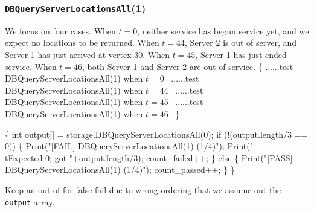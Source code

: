 \documentclass{article}
\def\nwendcode{\endtrivlist \endgroup}
\let\nwdocspar=\par
\theoremstyle{definition}
\begin{document}
\subsubsection{{\tt{}DBQueryServerLocationsAll}(1)}
We focus on four cases. When $t=0$, neither service has begun service yet,
and we expect no locations to be returned. When $t=44$, Server 2 is out of
server, and Server 1 has just arrived at vertex 30. When $t=45$, Server 1
has just ended service. When $t=46$, both Server 1 and Server 2 are out of
service.
\nwenddocs{}\endmoddef{}
\{
  \LA{}......test \code{}DBQueryServerLocationsAll\edoc{}(1) when $t=0$~{\nwtagstyle{}}\RA{}
  \LA{}......test \code{}DBQueryServerLocationsAll\edoc{}(1) when $t=44$~{\nwtagstyle{}}\RA{}
  \LA{}......test \code{}DBQueryServerLocationsAll\edoc{}(1) when $t=45$~{\nwtagstyle{}}\RA{}
  \LA{}......test \code{}DBQueryServerLocationsAll\edoc{}(1) when $t=46$~{\nwtagstyle{}}\RA{}
\}
\nwendcode{}\nwdocspar
\nwenddocs{}\endmoddef{}
\{
  int output[] = storage.DBQueryServerLocationsAll(0);
  if (!(output.length/3 == 0)) \{
    Print("[FAIL] DBQueryServerLocationsAll(1) (1/4)");
    Print("\\tExpected 0; got "+output.length/3);
    count_failed++;
  \} else \{
    Print("[PASS] DBQueryServerLocationsAll(1) (1/4)");
    count_passed++;
  \}
\}
\nwendcode{}\nwdocspar
Keep an out of for false fail due to wrong ordering that we assume out
the {\tt{}output} array.
\nwenddocs{}\endmoddef{}
\end{document}
